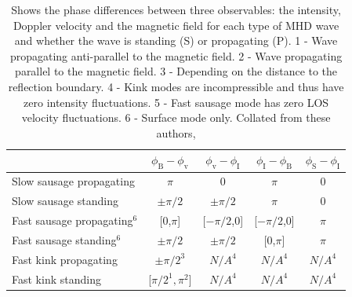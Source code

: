     \begin{table}
        \centering
        \begin{tabular}{l|c|c|c|c}
            &$\phi_{\mathrm{B}}-\phi_{\mathrm{v}}$&$\phi_{\mathrm{v}}-\phi_{\mathrm{I}}$&$\phi_{\mathrm{I}}-\phi_{\mathrm{B}}$&$\phi_{\mathrm{S}}-\phi_{\mathrm{I}}$ \\ \hline\hline
        Slow sausage propagating        & $\pi$ & 0 & $\pi$ & 0 \\
        Slow sausage standing           & $\pm\pi/2$ & $\pm\pi/2$ & $\pi$ & 0 \\
        Fast sausage propagating$^6$    & [0,$\pi$] & [$-\pi/2$,0] & [$-\pi/2$,0] & $\pi$ \\
        Fast sausage standing$^6$       & $\pm\pi/2$ & $\pm\pi/2$ & [0,$\pi$] & $\pi$  \\
        Fast kink propagating       	& $\pm\pi/2^3$ & $N/A^4$ & $N/A^4$ & $N/A^4$ \\
        Fast kink standing          	& [$\pi/2^1,\pi^2$] & $N/A^4$ & $N/A^4$ & $N/A^4$ \\ \hline
        \end{tabular}
        \caption{
            Shows the phase differences between three observables: the intensity, Doppler velocity and the magnetic field for each type of MHD wave and whether the wave is standing (S) or propagating (P).
            1 - Wave propagating anti-parallel to the magnetic field.
            2 - Wave propagating parallel to the magnetic field. 
            3 - Depending on the distance to the reflection boundary.
            4 - Kink modes are incompressible and thus have zero intensity fluctuations.
            5 - Fast sausage mode has zero LOS velocity fluctuations.
            6 - Surface mode only.
            Collated from these authors, \cite{CLOO,PMHDW,Moreels2013,Moreels2013b,2015A&A...579A..73M}}
        \label{tab:phase}
    \end{table}
    
